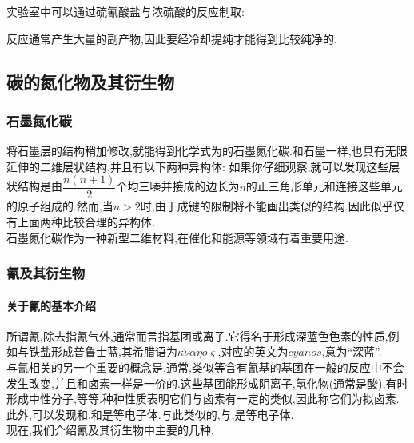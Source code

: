 \documentclass{ctexart}
\begin{document}
\indent 实验室中可以通过硫氰酸盐与浓硫酸的反应制取:
\begin{center}
\end{center}
反应通常产生大量的副产物,因此要经冷却提纯才能得到比较纯净的.
\subsection{碳的氮化物及其衍生物}
\subsubsection{石墨氮化碳}
将石墨层的结构稍加修改,就能得到化学式为的石墨氮化碳.和石墨一样,也具有无限延伸的二维层状结构,并且有以下两种异构体:
如果你仔细观察,就可以发现这些层状结构是由$\dfrac{n(n+1)}{2}$个均三嗪并接成的边长为$n$的正三角形单元和连接这些单元的原子组成的.然而,当$n>2$时,由于成键的限制将不能画出类似的结构.因此似乎仅有上面两种比较合理的异构体.\\
\indent 石墨氮化碳作为一种新型二维材料,在催化和能源等领域有着重要用途.
\subsubsection{氰及其衍生物}
\paragraph{关于氰的基本介绍}
所谓氰,除去指氰气外,通常而言指基团或离子.它得名于形成深蓝色色素的性质,例如与铁盐形成普鲁士蓝,其希腊语为$\kappa\acute{\nu}\alpha\eta o\varsigma$,对应的英文为$cyanos$,意为“深蓝”.\\
\indent 与氰相关的另一个重要的概念是.通常,类似等含有氰基的基团在一般的反应中不会发生改变,并且和卤素一样是一价的.这些基团能形成阴离子,氢化物(通常是酸),有时形成中性分子,等等.种种性质表明它们与卤素有一定的类似,因此称它们为拟卤素.\\
\indent 此外,可以发现和,和是等电子体.与此类似的,与,是等电子体.\\
\indent 现在,我们介绍氰及其衍生物中主要的几种.
\end{document}
